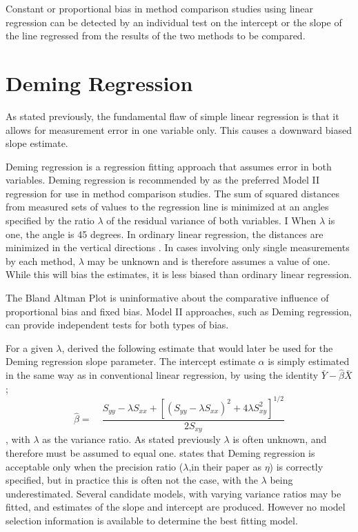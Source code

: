 \documentclass[12pt, a4paper]{report}
\theoremstyle{plain}
\theoremstyle{definition}
\theoremstyle{remark}
\begin{document}
Constant or proportional bias in method comparison studies using linear regression can be detected by an individual test on the intercept or the slope of the line regressed from the results of the two methods to be compared.




\section{Deming Regression}

As stated previously, the fundamental flaw of simple linear regression is that it allows for measurement error in one variable only. This causes a downward biased slope estimate.

Deming regression is a regression fitting approach that assumes error in both variables. Deming regression is recommended by \citet*{CornCoch} as the
preferred Model II regression for use in method comparison
studies. The sum of squared distances from measured sets of values to the regression line is minimized at an angles specified by the ratio $\lambda$ of the residual variance of both variables. I
When $\lambda$ is one, the angle is 45 degrees. In ordinary linear regression, the distances are minimized in the vertical directions \citep{linnet99}.
In cases involving only single measurements by each method, $\lambda$ may be unknown and is therefore assumes a value of one. While this will bias the estimates, it is less biased than ordinary linear regression.

The Bland Altman Plot is uninformative about the comparative influence of proportional bias and fixed bias. Model II approaches, such as Deming regression,  can provide independent tests for
both types of bias.

For a given $\lambda$, \citet{Kummel} derived the following estimate that would later be used for the Deming regression slope
parameter. The intercept estimate $\alpha$ is simply estimated in the same way as in conventional linear
regression, by using the identity $\bar{Y}-\hat{\beta}\bar{X}$;
\begin{equation}
	\hat{\beta} =\quad \frac{S_{yy} - \lambda S_{xx}+[(S_{yy} -
		\lambda S_{xx})^{2}+ 4\lambda S^{2}_{xy}]^{1/2}}{2S_{xy}}
\end{equation},
with $\lambda$ as the variance ratio. As stated previously $\lambda$ is often unknown, and therefore must be assumed to equal one. \citet{CarollRupert} states that Deming
regression is acceptable only when the precision ratio ($\lambda$,in their paper as $\eta$) is correctly specified, but in practice this is often not the case, with the $\lambda$ being underestimated. Several candidate models, with varying variance ratios may be fitted, and estimates of the slope and intercept are produced. However no model selection information is available to determine the best fitting model.
\end{document}
